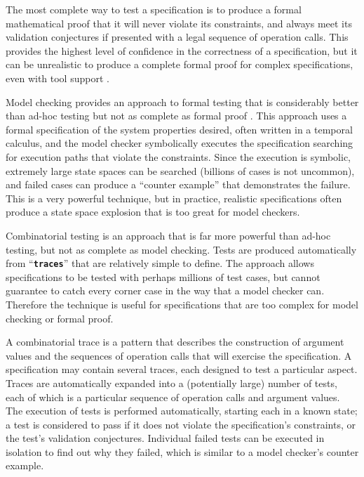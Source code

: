 \documentclass{overturerepchap}
\begin{document}
The most complete way to test a specification is to produce a formal
mathematical proof that it will never violate its constraints, and always meet
its validation conjectures if presented with a legal sequence of operation
calls. This provides the highest level of confidence in the correctness of a
specification, but it can be unrealistic to produce a complete formal proof for
complex specifications, even with tool support \cite{Paulson97,Bicarregui&94}.

Model checking provides an approach to formal testing that is considerably
better than ad-hoc testing but not as complete as formal proof \cite{Clarke&99}. This approach
uses a formal specification of the system properties desired, often written in a
temporal calculus, and the model checker symbolically executes the
specification searching for execution paths that violate the constraints. Since
the execution is symbolic, extremely large state spaces can be searched
(billions of cases is not uncommon), and failed cases can produce a ``counter
example'' that demonstrates the failure. This is a very powerful technique, but
in practice, realistic specifications often produce a state space explosion
that is too great for model checkers.

Combinatorial testing is an approach that is far more powerful than ad-hoc
testing, but not as complete as model checking. Tests are produced automatically
from ``\texttt{\textbf{traces}}'' that are relatively simple to define. The approach allows
specifications to be tested with perhaps millions of test cases, but cannot
guarantee to catch every corner case in the way that a model checker can.
Therefore the technique is useful for specifications that are too complex for
model checking or formal proof.

A combinatorial trace is a pattern that describes the construction of
argument values and the sequences of operation calls that will exercise the
specification. A specification may contain several traces, each designed to test
a particular aspect. Traces are automatically expanded into a (potentially
large) number of tests, each of which is a particular sequence of operation
calls and argument values. The execution of tests is performed
automatically, starting each in a known state; a test is considered to pass if
it does not violate the specification's constraints, or the test's validation
conjectures. Individual failed tests can be executed in isolation to find out
why they failed, which is similar to a model checker's counter example. 
\end{document}
